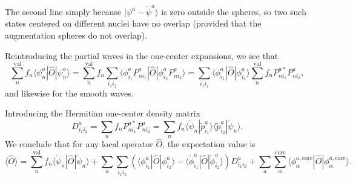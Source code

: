 \documentclass[a4paper]{article}
\newcommand{\s}[1]{\tilde{#1}}
\newcommand{\wh}[1]{\widehat{#1}}
\newcommand{\bra}[1]{\langle #1 |}
\newcommand{\ket}[1]{| #1 \rangle}
\newcommand{\braket}[2]{\langle #1 | #2 \rangle}
\begin{document}
The second line simply because $\ket{\psi^a - \s{\psi}^a}$ is zero
outside the spheres, so two such states centered on different nuclei
have no overlap (provided that the augmentation spheres do not
overlap).
\par Reintroducing the partial waves in the one-center expansions, we see that
%
\begin{equation}
\sum_n^\text{val} f_n \bra{\psi_{n}^{a}}\wh{O}\ket{\psi_{n}^{a}} = \sum_n^\text{val} f_n \sum_{i_1i_2} \bra{\phi_{i_1}^{a}P^a_{ni_1}} \wh{O} \ket{\phi_{i_2}^{a} P_{ni_2}^{a}} = \sum_{i_1i_2}\bra{\phi_{i_1}^{a}}\wh{O}\ket{\phi_{i_2}^a} \sum_n^\text{val} f_n P_{ni_1}^{a*}P_{ni_2}^a,
\end{equation}
%
and likewise for the smooth waves.%
\par Introducing the Hermitian one-center density matrix 
%
\begin{equation}\label{eq: density matrix}
D_{i_1i_2}^a =\sum_n f_n P_{ni_1}^{a*} P_{ni_2}^{a} = \sum_n f_n
\braket{\s{\psi}_n}{\s{p}_{i_1}^a}
\braket{\s{p}_{i_2}^a}{\s{\psi}_n}.
\end{equation}
%
We conclude that for any local operator $\wh{O}$, the expectation value is
%
\begin{equation}\label{eq: local exp values}
  \langle \wh{O} \rangle = \sum_n^\text{val} f_n \bra{\s{\psi}_n}\wh{O}\ket{\s{\psi}_n} + \sum_a \sum_{i_1i_2} \left( \bra{\phi_{i_1}^{a}}\wh{O}\ket{\phi_{i_2}^a} - \bra{\s{\phi}_{i_1}^{a}}\wh{O}\ket{\s{\phi}_{i_2}^a} \right)D_{i_1i_2}^a + \sum_a \sum_\alpha^\text{core} \bra{\phi_\alpha^{a,\text{core}}}\wh{O}\ket{\phi_\alpha^{a,\text{core}}}.
\end{equation}
%
\end{document}
